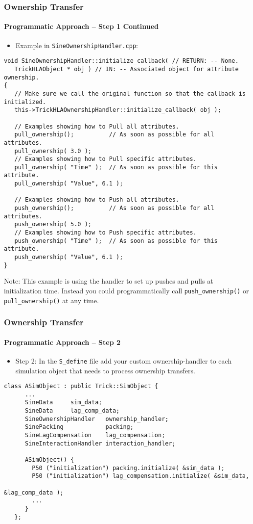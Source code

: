    \begin{frame}[fragile]
      \frametitle{Ownership Transfer}
      \framesubtitle{Programmatic Approach – Step 1 Continued}
      \begin{itemize}
         \item Example in \texttt{SineOwnershipHandler.cpp}:
      \end{itemize}
\begin{Verbatim}[frame=single, fontsize=\tiny]
void SineOwnershipHandler::initialize_callback( // RETURN: -- None.
   TrickHLAObject * obj ) // IN: -- Associated object for attribute ownership.
{
   // Make sure we call the original function so that the callback is initialized.
   this->TrickHLAOwnershipHandler::initialize_callback( obj );

   // Examples showing how to Pull all attributes.
   pull_ownership();          // As soon as possible for all attributes.
   pull_ownership( 3.0 );
   // Examples showing how to Pull specific attributes.
   pull_ownership( "Time" );  // As soon as possible for this attribute.
   pull_ownership( "Value", 6.1 );

   // Examples showing how to Push all attributes.
   push_ownership();          // As soon as possible for all attributes.
   push_ownership( 5.0 );
   // Examples showing how to Push specific attributes.
   push_ownership( "Time" );  // As soon as possible for this attribute.
   push_ownership( "Value", 6.1 );
}
\end{Verbatim}
      \begin{footnotesize}
      Note: This example is using the handler to set up pushes and pulls at
      initialization time. Instead you could programmatically call
      \texttt{push\_ownership()} or \texttt{pull\_ownership()} at any time.
      \end{footnotesize}
   \end{frame}

   \begin{frame}[fragile]
      \frametitle{Ownership Transfer}
      \framesubtitle{Programmatic Approach – Step 2}
      \begin{itemize}
         \item Step 2: In the \texttt{S\_define} file add your custom
         ownership-handler to each simulation object that needs to process
         ownership transfers.
      \end{itemize}
\begin{Verbatim}[frame=single, fontsize=\scriptsize]
   class ASimObject : public Trick::SimObject {
      ...
      SineData     sim_data;
      SineData     lag_comp_data;
      SineOwnershipHandler   ownership_handler;
      SinePacking            packing;
      SineLagCompensation    lag_compensation;
      SineInteractionHandler interaction_handler;

      ASimObject() {
        P50 ("initialization") packing.initialize( &sim_data );
        P50 ("initialization") lag_compensation.initialize( &sim_data, 
                                                            &lag_comp_data );
        ...
      }
   };
\end{Verbatim}
   \end{frame}

